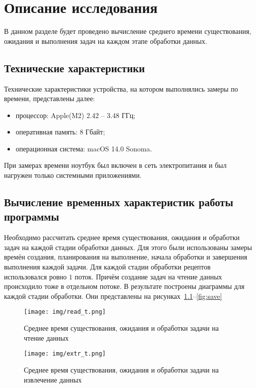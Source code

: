 \chapter{Описание исследования}

В данном разделе будет проведено вычисление среднего времени существования, ожидания и выполнения задач на каждом этапе обработки данных.


\section{Технические характеристики} {
    Технические характеристики устройства, на котором выполнялись замеры по времени, представлены далее:
    \begin{itemize}
        \item процессор: Apple(M2) 2.42 -- 3.48 ГГц;
        \item оперативная память: 8 Гбайт;
        \item операционная система: macOS 14.0 Sonoma.
    \end{itemize}
}

При замерах времени ноутбук был включен в сеть электропитания и был нагружен только системными приложениями.

\section{Вычисление временных характеристик работы \newline программы}
Необходимо рассчитать среднее время существования, ожидания и обработки задач на каждой стадии обработки данных.
Для этого были использованы замеры времён создания, планирования на выполнение, начала обработки и завершения выполнения каждой задачи.
Для каждой стадии обработки рецептов использовался ровно $1$ поток.
Причём создание задач на чтение данных происходило тоже в отдельном потоке.
В результате построены диаграммы для каждой стадии обработки.
Они представлены на рисунках~\ref{fig:read}--\ref{fig:save}

\begin{figure}[H]
	\centering
	\texttt{[image: img/read\_t.png]}
	\caption{Среднее время существования, ожидания и обработки задачи на чтение данных}
	\label{fig:read}
\end{figure}

\begin{figure}[H]
	\centering
	\texttt{[image: img/extr\_t.png]}
	\caption{Среднее время существования, ожидания и обработки задачи на извлечение данных}
	\label{fig:extr}
\end{figure}

